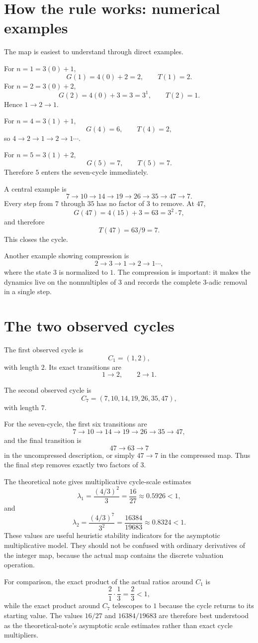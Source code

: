 \documentclass[11pt]{article}
\begin{document}
\section{How the rule works: numerical examples}
The map is easiest to understand through direct examples.

For $n=1=3(0)+1$,
\[
G(1)=4(0)+2=2,
\qquad T(1)=2.
\]
For $n=2=3(0)+2$,
\[
G(2)=4(0)+3=3=3^1,
\qquad T(2)=1.
\]
Hence $1\to2\to1$.

For $n=4=3(1)+1$,
\[
G(4)=6,
\qquad T(4)=2,
\]
so $4\to2\to1\to2\to1\cdots$.

For $n=5=3(1)+2$,
\[
G(5)=7,
\qquad T(5)=7.
\]
Therefore $5$ enters the seven-cycle immediately.

A central example is
\[
7\to10\to14\to19\to26\to35\to47\to7.
\tag{2}
\]
Every step from $7$ through $35$ has no factor of $3$ to remove. At $47$,
\[
G(47)=4(15)+3=63=3^2\cdot7,
\]
and therefore
\[
T(47)=63/9=7.
\]
This closes the cycle.

Another example showing compression is
\[
2\to3\to1\to2\to1\cdots,
\]
where the state $3$ is normalized to $1$. The compression is important: it makes the dynamics live on the nonmultiples of $3$ and records the complete $3$-adic removal in a single step.

\section{The two observed cycles}
The first observed cycle is
\[
C_1=(1,2),
\]
with length $2$. Its exact transitions are
\[
1\to2,
\qquad 2\to1.
\]

The second observed cycle is
\[
C_7=(7,10,14,19,26,35,47),
\]
with length $7$.

For the seven-cycle, the first six transitions are
\[
7\to10\to14\to19\to26\to35\to47,
\]
and the final transition is
\[
47\to63\to7
\]
in the uncompressed description, or simply $47\to7$ in the compressed map. Thus the final step removes exactly two factors of $3$.

The theoretical note gives multiplicative cycle-scale estimates
\[
\lambda_1=\frac{(4/3)^2}{3}=\frac{16}{27}\approx0.5926<1,
\]
and
\[
\lambda_2=\frac{(4/3)^7}{3^2}
=\frac{16384}{19683}
\approx0.8324<1.
\]
These values are useful heuristic stability indicators for the asymptotic multiplicative model. They should not be confused with ordinary derivatives of the integer map, because the actual map contains the discrete valuation operation.

For comparison, the exact product of the actual ratios around $C_1$ is
\[
\frac21\cdot\frac13=\frac23<1,
\]
while the exact product around $C_7$ telescopes to $1$ because the cycle returns to its starting value. The values $16/27$ and $16384/19683$ are therefore best understood as the theoretical-note's asymptotic scale estimates rather than exact cycle multipliers.
\end{document}

